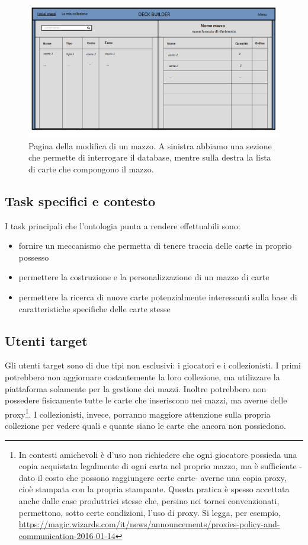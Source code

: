 \documentclass[12pt]{article}
\begin{document}
\begin{figure}[H]
    \centering
         \includegraphics[width=13cm]{files/mockup_modifica_mazzo.png}
    \caption{Pagina della modifica di un mazzo. A sinistra abbiamo una sezione che permette di interrogare il database, mentre sulla destra la lista di carte che compongono il mazzo.}
    \label{fig:mockup_modifica_mazzo}
\end{figure}


\subsection{Task specifici e contesto}
I task principali che l'ontologia punta a rendere effettuabili sono:
\begin{itemize}
    \item fornire un meccanismo che permetta di tenere traccia delle carte in proprio possesso
    \item permettere la costruzione e la personalizzazione di un mazzo di carte
    \item permettere la ricerca di nuove carte potenzialmente interessanti sulla base di caratteristiche specifiche delle carte stesse
\end{itemize}

\subsection{Utenti target}
Gli utenti target sono di due tipi non esclusivi: i giocatori e i collezionisti. I primi potrebbero non aggiornare costantemente la loro collezione, ma utilizzare la piattaforma solamente per la gestione dei mazzi. Inoltre potrebbero non possedere fisicamente tutte le carte che inseriscono nei mazzi, ma averne delle proxy\footnote{In contesti amichevoli è d'uso non richiedere che ogni giocatore possieda una copia acquistata legalmente di ogni carta nel proprio mazzo, ma è sufficiente -dato il costo che possono raggiungere certe carte- averne una copia proxy, cioè stampata con la propria stampante. Questa pratica è spesso accettata anche dalle case produttrici stesse che, persino nei tornei convenzionati, permettono, sotto certe condizioni, l'uso di proxy. Si legga, per esempio, \url{https://magic.wizards.com/it/news/announcements/proxies-policy-and-communication-2016-01-14}}. I collezionisti, invece, porranno maggiore attenzione sulla propria collezione per vedere quali e quante siano le carte che ancora non possiedono.
\end{document}
